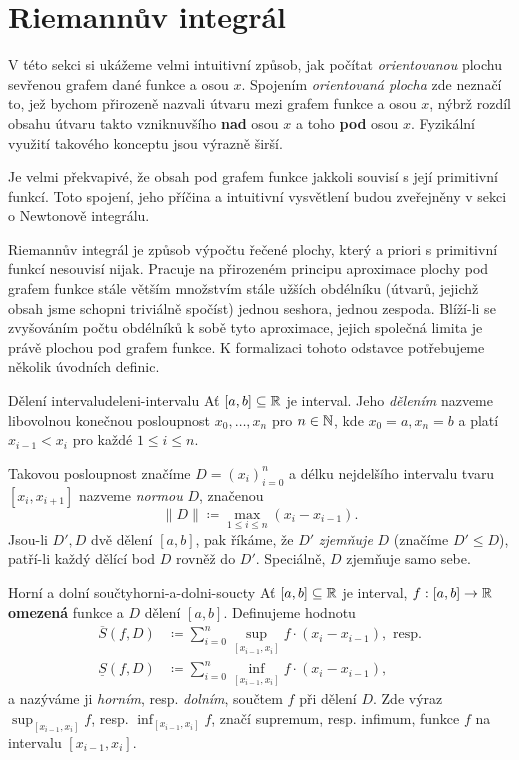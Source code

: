 \section{Riemannův integrál}
\label{sec:riemannuv-integral}

V této sekci si ukážeme velmi intuitivní způsob, jak počítat \emph{orientovanou}
plochu sevřenou grafem dané funkce a osou $x$. Spojením \emph{orientovaná
plocha} zde neznačí to, jež bychom přirozeně nazvali  útvaru mezi
grafem funkce a osou $x$, nýbrž rozdíl obsahu útvaru takto vzniknuvšího
\textbf{nad} osou $x$ a toho \textbf{pod} osou $x$. Fyzikální využití takového
konceptu jsou výrazně širší.

Je velmi překvapivé, že obsah pod grafem funkce jakkoli souvisí s její
primitivní funkcí. Toto spojení, jeho příčina a intuitivní vysvětlení budou
zveřejněny v sekci o Newtonově integrálu.

Riemannův integrál je způsob výpočtu řečené plochy, který a priori s primitivní
funkcí nesouvisí nijak. Pracuje na přirozeném principu aproximace plochy pod
grafem funkce stále větším množstvím stále užších obdélníku (útvarů, jejichž
obsah jsme schopni triviálně spočíst) jednou seshora, jednou zespoda. Blíží-li
se zvyšováním počtu obdélníků k sobě tyto aproximace, jejich společná limita je
právě plochou pod grafem funkce. K formalizaci tohoto odstavce potřebujeme
několik úvodních definic.

\begin{definition}{Dělení intervalu}{deleni-intervalu}
 Ať $[a,b] \subseteq \mathbb{R}$ je interval. Jeho \emph{dělením} nazveme libovolnou
 konečnou posloupnost $x_0,\ldots,x_n$ pro $n \in \mathbb{N}$, kde $x_0 = a, x_n = b$ a
 platí $x_{i-1} < x_{i}$ pro každé $1 \leq i \leq n$.

 Takovou posloupnost značíme $D = (x_i)_{i=0}^{n}$ a délku nejdelšího intervalu
 tvaru $[x_i,x_{i+1}]$ nazveme \emph{normou} $D$, značenou
 \[
  \|D\| \coloneqq \max_{1 \leq i \leq n} (x_{i} - x_{i-1}).
 \]
 Jsou-li $D',D$ dvě dělení $[a,b]$, pak říkáme, že $D'$ \emph{zjemňuje} $D$
 (značíme $D' \leq D$), patří-li každý dělící bod $D$ rovněž do $D'$.
 Speciálně, $D$ zjemňuje samo sebe.
\end{definition}

\begin{definition}{Horní a dolní součty}{horni-a-dolni-soucty}
 Ať $[a,b] \subseteq \mathbb{R}$ je interval, $f:[a,b] \to \mathbb{R}$ \textbf{omezená} funkce a
 $D$ dělení $[a,b]$. Definujeme hodnotu
 \begin{align*}
  \overline{S}(f,D) &\coloneqq \sum_{i=0}^n \sup_{[x_{i-1},x_i]} f \cdot (x_i -
  x_{i-1}), \text{ resp.}\\
  \underline{S}(f,D) & \coloneqq \sum_{i=0}^n \inf_{[x_{i-1},x_i]} f \cdot (x_i
  - x_{i-1}),
 \end{align*}
 a nazýváme ji \emph{horním}, resp. \emph{dolním}, součtem $f$ při dělení $D$.
 Zde výraz $\sup_{[x_{i-1},x_i]} f$, resp. $\inf_{[x_{i-1},x_i]} f$, značí
 supremum, resp. infimum, funkce $f$ na intervalu $[x_{i-1},x_i]$.
\end{definition}

